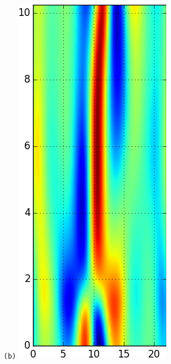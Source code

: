 \documentclass[final,leqno,onefignum,onetabnum]{siamltexmm}
\begin{document}
\begin{figure}[h]
\begin{minipage}{.115\textwidth}
  \end{minipage}
  \begin{minipage}{.115\textwidth}
    \centering \small{\texttt{(b)}}
    \includegraphics[width=\textwidth]{ppo1Fv5_64}

\end{minipage}
\end{figure}
\end{document}
